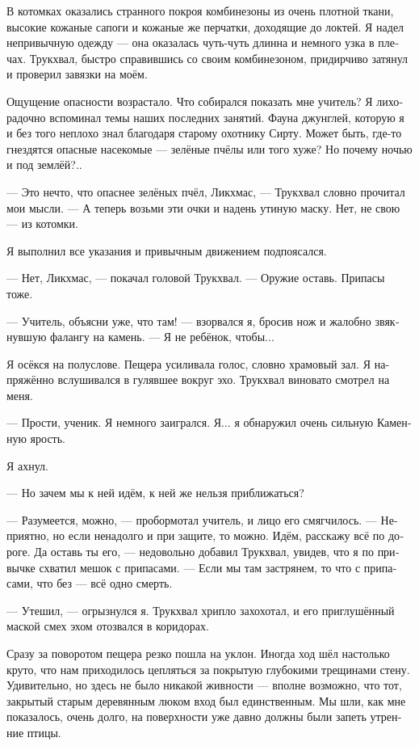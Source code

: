\documentclass[a4paper,12pt,fleqn]{book}\usepackage{cooltooltips}\usepackage{polyglossia}\setdefaultlanguage[babelshorthands=true]{russian}\setotherlanguage{english}\defaultfontfeatures{Ligatures=TeX,Mapping=tex-text} \usepackage{xcolor}\definecolor{lightgray}{HTML}{bbbbbb}\color{lightgray}\newcommand{\ml}[3]{\textenglish{\textcolor{black}{#3}}}
\newcommand{\asterism}{\vspace{1em}{\centering\Large\bfseries$\ast~\ast~\ast$\par}\vspace{1em}}
\begin{document}
{В котомках оказались странного покроя комбинезоны из очень плотной ткани, высокие кожаные сапоги и кожаные же перчатки, доходящие до локтей.
Я надел непривычную одежду --- она оказалась чуть-чуть длинна и немного узка в плечах.
Трукхвал, быстро справившись со своим комбинезоном, придирчиво затянул и проверил завязки на моём.

Ощущение опасности возрастало.
Что собирался показать мне учитель?
Я лихорадочно вспоминал темы наших последних занятий.
Фауна джунглей, которую я и без того неплохо знал благодаря старому охотнику Сирту.
Может быть, где-то гнездятся опасные насекомые --- зелёные пчёлы или того хуже?
Но почему ночью и под землёй?..

--- Это нечто, что опаснее зелёных пчёл, Ликхмас, --- Трукхвал словно прочитал мои мысли.
--- А теперь возьми эти очки и надень утиную маску.
Нет, не свою --- из котомки.

Я выполнил все указания и привычным движением подпоясался.

--- Нет, Ликхмас, --- покачал головой Трукхвал.
--- Оружие оставь.
Припасы тоже.

--- Учитель, объясни уже, что там! --- взорвался я, бросив нож и жалобно звякнувшую фалангу на камень.
--- Я не ребёнок, чтобы...

Я осёкся на полуслове.
Пещера усиливала голос, словно храмовый зал.
Я напряжённо вслушивался в гулявшее вокруг эхо.
Трукхвал виновато смотрел на меня.

--- Прости, ученик.
Я немного заигрался.
Я... я обнаружил очень сильную Каменную ярость.

Я ахнул.

--- Но зачем мы к ней идём, к ней же нельзя приближаться?

--- Разумеется, можно, --- пробормотал учитель, и лицо его смягчилось.
--- Неприятно, но если ненадолго и при защите, то можно.
Идём, расскажу всё по дороге.
Да оставь ты его, --- недовольно добавил Трукхвал, увидев, что я по привычке схватил мешок с припасами.
--- Если мы там застрянем, то что с припасами, что без --- всё одно смерть.

--- Утешил, --- огрызнулся я.
Трукхвал хрипло захохотал, и его приглушённый маской смех эхом отозвался в коридорах.

\asterism

Сразу за поворотом пещера резко пошла на уклон.
Иногда ход шёл настолько круто, что нам приходилось цепляться за покрытую глубокими трещинами стену.
Удивительно, но здесь не было никакой живности --- вполне возможно, что тот, закрытый старым деревянным люком вход был единственным.
Мы шли, как мне показалось, очень долго, на поверхности уже давно должны были запеть утренние птицы.

}
\end{document}
